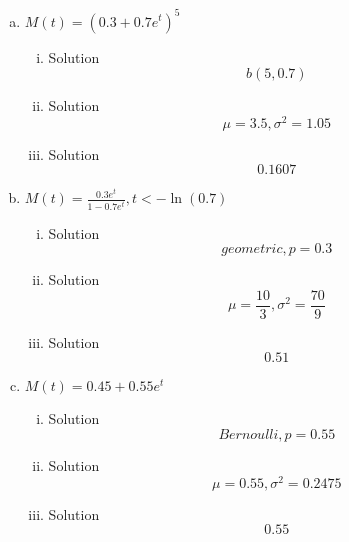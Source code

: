 \documentclass{article}
\begin{document}
\begin{spacing}{1.1}
\begin{homeworkProblem}
	\begin{enumerate}[(a)]
		\item $M(t) = (0.3 + 0.7e^t)^5$
			\begin{enumerate}[(i)]
				\item 
					\begin{homeworkSection}{Solution}
						\[b(5, 0.7)\]
					\end{homeworkSection}
				\item 
					\begin{homeworkSection}{Solution}
						\[ \mu = 3.5, \sigma^2 = 1.05\]
					\end{homeworkSection}
				\item 
					\begin{homeworkSection}{Solution}
						\[0.1607\]
					\end{homeworkSection}
			\end{enumerate}
		\item $M(t) = \frac {0.3e^t}{1 - 0.7e^t}, t < - \ln (0.7)$
			\begin{enumerate}[(i)]
				\item 
					\begin{homeworkSection}{Solution}
						\[ geometric,  p = 0.3\]
					\end{homeworkSection}
				\item 
					\begin{homeworkSection}{Solution}
						\[ \mu = \frac {10}{3}, \sigma^2 = \frac{70}{9} \]
					\end{homeworkSection}
				\item 
					\begin{homeworkSection}{Solution}
						\[0.51\]
					\end{homeworkSection}
			\end{enumerate}
		\item $M(t) = 0.45 + 0.55e^t$
			\begin{enumerate}[(i)]
				\item 
					\begin{homeworkSection}{Solution}
						\[ Bernoulli, p = 0.55\]
					\end{homeworkSection}
				\item 
					\begin{homeworkSection}{Solution}
						\[ \mu = 0.55, \sigma^2 = 0.2475\]
					\end{homeworkSection}
				\item 
					\begin{homeworkSection}{Solution}
						\[0.55\]
					\end{homeworkSection}

\end{enumerate}
\end{enumerate}
\end{homeworkProblem}
\end{spacing}
\end{document}
